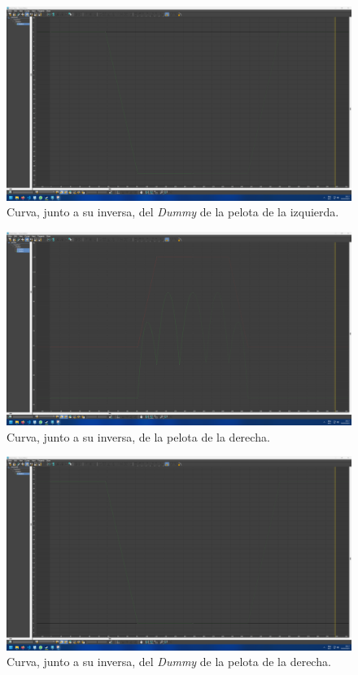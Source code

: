 \begin{figure}[H]
   \centering
   \includegraphics[width=\textwidth]{imagenes/curvas finales/DPL.png}
   \caption{Curva, junto a su inversa, del \textit{Dummy} de la pelota de la izquierda.}
\end{figure}

\begin{figure}[H]
   \centering
   \includegraphics[width=\textwidth]{imagenes/curvas finales/PR.png}
   \caption{Curva, junto a su inversa, de la pelota de la derecha.}
\end{figure}

\begin{figure}[H]
   \centering
   \includegraphics[width=\textwidth]{imagenes/curvas finales/DPR.png}
   \caption{Curva, junto a su inversa, del \textit{Dummy} de la pelota de la derecha.}
\end{figure}

